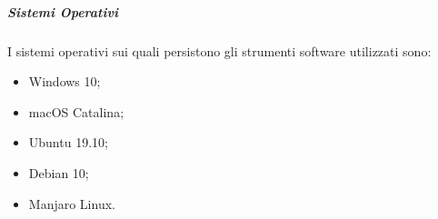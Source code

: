 \documentclass[../norme-di-progetto.tex]{subfiles}
\begin{document}
\subparagraph{Sistemi Operativi}
I sistemi operativi sui quali persistono gli strumenti software utilizzati sono:
\begin{itemize}
  \item Windows 10;
  \item macOS Catalina;
  \item Ubuntu 19.10;
  \item Debian 10;
  \item Manjaro Linux.
\end{itemize}
\end{document}
